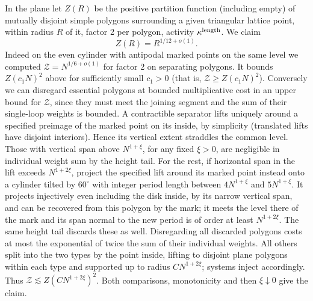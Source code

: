In the plane let \(Z(R)\) be the positive partition function (including empty) of mutually disjoint simple polygons surrounding a given triangular lattice point, within radius \(R\) of it, factor 2 per polygon, activity \(\kappa^{\rm length}\). We claim
\[
 Z(R)=R^{1/12+o(1)}.
\]
Indeed on the even cylinder with antipodal marked points on the same level we computed \(\mathcal Z=N^{1/6+o(1)}\) for factor 2 on separating polygons. It bounds \(Z(c_1 N)^2\) above for sufficiently small \(c_1>0\) (that is, \(\mathcal Z\ge Z(c_1 N)^2\)). Conversely we can disregard essential polygons at bounded multiplicative cost in an upper bound for \(\mathcal Z\), since they must meet the joining segment and the sum of their single-loop weights is bounded. A contractible separator lifts uniquely around a specified preimage of the marked point on its inside, by simplicity (translated lifts have disjoint interiors). Hence its vertical extent straddles the common level. Those with vertical span above \(N^{1+\xi}\), for any fixed \(\xi>0\), are negligible in individual weight sum by the height tail. For the rest, if horizontal span in the lift exceeds \(N^{1+2\xi}\), project the specified lift around its marked point instead onto a cylinder tilted by \(60^\circ\) with integer period length between \(4 N^{1+\xi}\) and \(5 N^{1+\xi}\). It projects injectively even including the disk inside, by its narrow vertical span, and can be recovered from this polygon by the mark; it meets the level there of the mark and its span normal to the new period is of order at least \(N^{1+2\xi}\). The same height tail discards these as well. Disregarding all discarded polygons costs at most the exponential of twice the sum of their individual weights. All others split into the two types by the point inside, lifting to disjoint plane polygons within each type and supported up to radius \(C N^{1+2\xi}\); systems inject accordingly. Thus
\(
 \mathcal Z\lesssim Z(C N^{1+2\xi})^2
\).
Both comparisons, monotonicity and then \(\xi\downarrow0\) give the claim.

